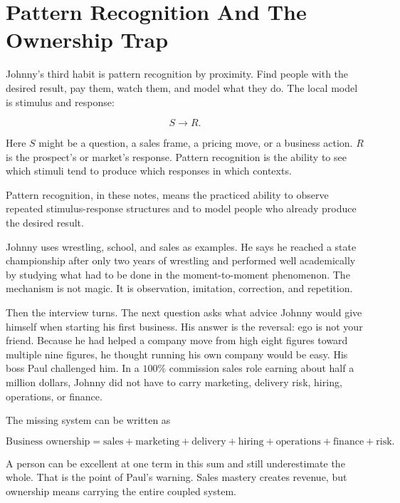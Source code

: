 \section{Pattern Recognition And The Ownership Trap}

Johnny's third habit is pattern recognition by proximity. Find people with the desired result, pay them, watch them, and model what they do. The local model is stimulus and response:

\begin{equation}
S \longrightarrow R.
\end{equation}

Here \(S\) might be a question, a sales frame, a pricing move, or a business action. \(R\) is the prospect's or market's response. Pattern recognition is the ability to see which stimuli tend to produce which responses in which contexts.

\begin{definition}
Pattern recognition, in these notes, means the practiced ability to observe repeated stimulus-response structures and to model people who already produce the desired result.
\end{definition}

Johnny uses wrestling, school, and sales as examples. He says he reached a state championship after only two years of wrestling and performed well academically by studying what had to be done in the moment-to-moment phenomenon. The mechanism is not magic. It is observation, imitation, correction, and repetition.

Then the interview turns. The next question asks what advice Johnny would give himself when starting his first business. His answer is the reversal: ego is not your friend. Because he had helped a company move from high eight figures toward multiple nine figures, he thought running his own company would be easy. His boss Paul challenged him. In a \(100\%\) commission sales role earning about half a million dollars, Johnny did not have to carry marketing, delivery risk, hiring, operations, or finance.

The missing system can be written as

\begin{equation}
\text{Business ownership}
=
\text{sales}
+
\text{marketing}
+
\text{delivery}
+
\text{hiring}
+
\text{operations}
+
\text{finance}
+
\text{risk}.
\end{equation}

A person can be excellent at one term in this sum and still underestimate the whole. That is the point of Paul's warning. Sales mastery creates revenue, but ownership means carrying the entire coupled system.

